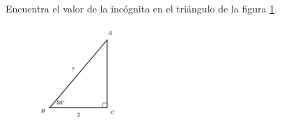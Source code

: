 \question[15]  Encuentra el valor de la incógnita en el triángulo de la figura \ref{fig:lados_functrig_17}.
\begin{figure}[H]
    \begin{center}
        \includegraphics[width=0.3\textwidth]{../images/lados_functrig_17.png}
    \end{center}
    \caption{}
    \label{fig:lados_functrig_17}
\end{figure}
